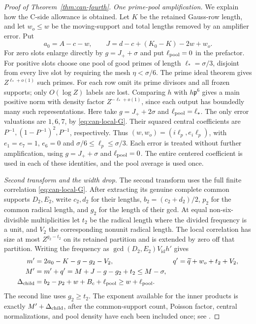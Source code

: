 \documentclass[11pt,a4paper]{article}
\numberwithin{equation}{section}
\theoremstyle{definition}
\theoremstyle{remark}
\begin{document}
\begin{proof}[Proof of Theorem~\ref{thm:can-fourth}]
\smallskip\noindent\emph{One prime-pool amplification.}
We explain how the C-side allowance is obtained.  Let $K$ be
the retained Gauss-row length, and let $w_o\le w$ be the
moving-support and total lengths removed by an amplifier
error.  Put
\[
 a_0=A-c-w,\qquad
 J=d-c+(K_0-K)-2w+w_o.
\]
For zero slots enlarge directly by $g=J_++\sigma$ and put
$\ell_{\rm pool}=0$ in the prefactor.
For positive slots choose one pool of good primes of length
$\ell_* =\sigma/3$, disjoint from every live slot by requiring
the mesh $\eta<\sigma/6$.
The prime ideal theorem gives $Z^{\ell_*+o(1)}$ such primes.
For each row omit its prime divisors and all frozen supports;
only $O(\log Z)$ labels are lost.
Comparing $h$ with $h\mathfrak p^6$ gives a main positive norm
with density factor $Z^{-\ell_*+o(1)}$, since each output has
boundedly many such representations.  Here take
$g=J_++2\sigma$ and $\ell_{\rm pool}=\ell_*$.
The only error valuations are $1,6,7$, by
\eqref{eq:can-local-G}.  Their squared central coefficients are
$P^{-1},(1-P^{-1})^2,P^{-1}$, respectively.
Thus $(w,w_o)=(i\ell_p,e_i\ell_p)$, with
$e_1=e_7=1$, $e_6=0$ and $\sigma/6\le\ell_p\le\sigma/3$.
Each error is treated without further amplification, using
$g=J_++\sigma$ and $\ell_{\rm pool}=0$.
The entire centered coefficient is used in each of these
identities, and the pool average is used once.

\smallskip\noindent\emph{Second transform and the width drop.}
The second transform uses the full finite correlation
\eqref{eq:can-local-G}.  After extracting its genuine
complete common supports $D_2,E_2$, write $c_2,d_2$ for their
lengths, $b_2=(c_2+d_2)/2$, $p_2$ for the common radical length,
and $g_2$ for the length of their gcd.
At equal non-six-divisible multiplicities let $t_2$ be the
radical length where the divided frequency is a unit, and
$V_2$ the corresponding nonunit radical length.
The local correlation has size at most $Z^{g_2-t_2}$ on its
retained partition and is extended by zero off that partition.
Writing the frequency as $\gcd(D_2,E_2)V_{\mathrm{id}}h'$ gives
\begin{align}\label{eq:can-plain-child}
 m'&=2a_0-K-g-g_2-V_2,&
 q'&=\widetilde q+w_o+t_2+V_2,\notag\\
 M'&=m'+q'=M+J-g-g_2+t_2\le M-\sigma,\\
 \Delta_{\rm child}&=b_2-p_2+w+B_c+\ell_{\rm pool}
                                      \ge w+\ell_{\rm pool}.\notag
\end{align}
The second line uses $g_2\ge t_2$.
The exponent available for the inner products is exactly
$M'+\Delta_{\rm child}$, after the common-support count,
Poisson factor, central normalizations, and pool density have
each been included once; see \cite[(18.32)--(18.33)]{Q}.


\end{proof}
\end{document}
